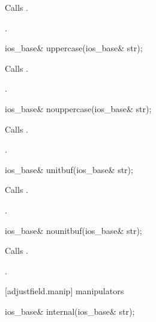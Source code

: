 \begin{itemdescr}
\pnum
\effects
Calls
.

\pnum
\returns
{}.
\end{itemdescr}

%
\begin{itemdecl}
ios_base& uppercase(ios_base& str);
\end{itemdecl}

\begin{itemdescr}
\pnum
\effects
Calls
.

\pnum
\returns
{}.
\end{itemdescr}

%
\begin{itemdecl}
ios_base& nouppercase(ios_base& str);
\end{itemdecl}

\begin{itemdescr}
\pnum
\effects
Calls
.

\pnum
\returns
{}.
\end{itemdescr}

%
\begin{itemdecl}
ios_base& unitbuf(ios_base& str);
\end{itemdecl}

\begin{itemdescr}
\pnum
\effects
Calls
.

\pnum
\returns
{}.
\end{itemdescr}

%
\begin{itemdecl}
ios_base& nounitbuf(ios_base& str);
\end{itemdecl}

\begin{itemdescr}
\pnum
\effects
Calls
.

\pnum
\returns
{}.
\end{itemdescr}

[adjustfield.manip]{ manipulators}

%
\begin{itemdecl}
ios_base& internal(ios_base& str);
\end{itemdecl}

